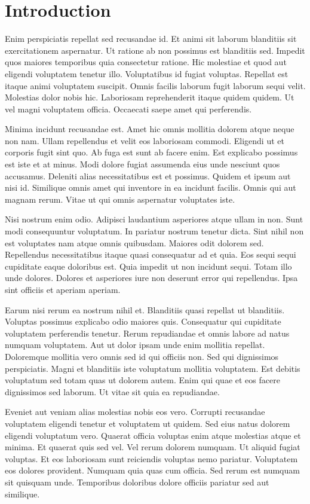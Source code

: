 \chapter{Introduction\label{intro}}


Enim perspiciatis repellat sed recusandae id. Et animi sit laborum blanditiis sit exercitationem aspernatur. Ut ratione ab non possimus est blanditiis sed. Impedit quos maiores temporibus quia consectetur ratione. Hic molestiae et quod aut eligendi voluptatem tenetur illo. Voluptatibus id fugiat voluptas. Repellat est itaque animi voluptatem suscipit. Omnis facilis laborum fugit laborum sequi velit. Molestias dolor nobis hic. Laboriosam reprehenderit itaque quidem quidem. Ut vel magni voluptatem officia. Occaecati saepe amet qui perferendis.

Minima incidunt recusandae est. Amet hic omnis mollitia dolorem atque neque non nam. Ullam repellendus et velit eos laboriosam commodi. Eligendi ut et corporis fugit sint quo. Ab fuga est sunt ab facere enim. Est explicabo possimus est iste et at minus. Modi dolore fugiat assumenda eius unde nesciunt quos accusamus. Deleniti alias necessitatibus est et possimus. Quidem et ipsum aut nisi id. Similique omnis amet qui inventore in ea incidunt facilis. Omnis qui aut magnam rerum. Vitae ut qui omnis aspernatur voluptates iste.

Nisi nostrum enim odio. Adipisci laudantium asperiores atque ullam in non. Sunt modi consequuntur voluptatum. In pariatur nostrum tenetur dicta. Sint nihil non est voluptates nam atque omnis quibusdam. Maiores odit dolorem sed. Repellendus necessitatibus itaque quasi consequatur ad et quia. Eos sequi sequi cupiditate eaque doloribus est. Quia impedit ut non incidunt sequi. Totam illo unde dolores. Dolores et asperiores iure non deserunt error qui repellendus. Ipsa sint officiis et aperiam aperiam.

Earum nisi rerum ea nostrum nihil et. Blanditiis quasi repellat ut blanditiis. Voluptas possimus explicabo odio maiores quis. Consequatur qui cupiditate voluptatem perferendis tenetur. Rerum repudiandae et omnis labore ad natus numquam voluptatem. Aut ut dolor ipsam unde enim mollitia repellat. Doloremque mollitia vero omnis sed id qui officiis non. Sed qui dignissimos perspiciatis. Magni et blanditiis iste voluptatum mollitia voluptatem. Est debitis voluptatum sed totam quas ut dolorem autem. Enim qui quae et eos facere dignissimos sed laborum. Ut vitae sit quia ea repudiandae.

Eveniet aut veniam alias molestias nobis eos vero. Corrupti recusandae voluptatem eligendi tenetur et voluptatem ut quidem. Sed eius natus dolorem eligendi voluptatum vero. Quaerat officia voluptas enim atque molestias atque et minima. Et quaerat quis sed vel. Vel rerum dolorem numquam. Ut aliquid fugiat voluptas. Et eos laboriosam sunt reiciendis voluptas nemo pariatur. Voluptatem eos dolores provident. Numquam quia quas cum officia. Sed rerum est numquam sit quisquam unde. Temporibus doloribus dolore officiis pariatur sed aut similique.

